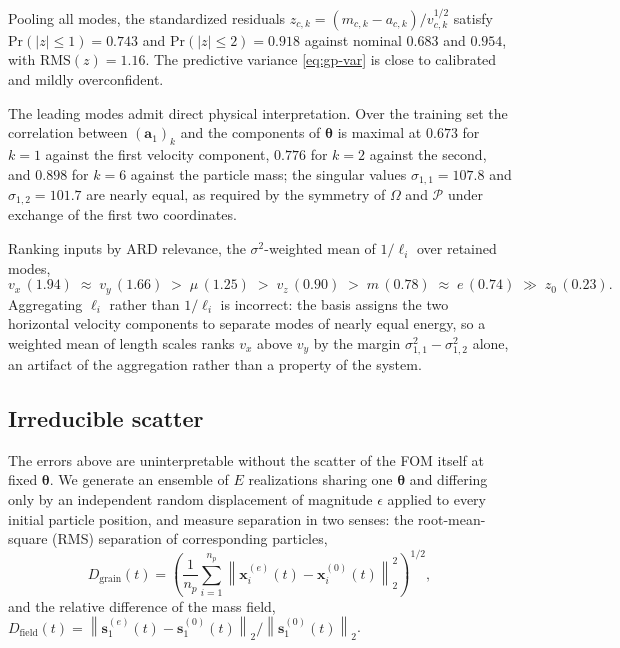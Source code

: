 \documentclass[11pt]{article}
\newcommand{\bs}[1]{\boldsymbol{#1}}
\newcommand{\norm}[1]{\left\lVert #1 \right\rVert}
\begin{document}
Pooling all modes, the standardized residuals
$z_{c,k} = (m_{c,k} - a_{c,k}) / v_{c,k}^{1/2}$ satisfy
$\mathrm{Pr}(|z| \leq 1) = 0.743$ and $\mathrm{Pr}(|z| \leq 2) = 0.918$ against nominal
$0.683$ and $0.954$, with $\mathrm{RMS}(z) = 1.16$. The predictive variance
\eqref{eq:gp-var} is close to calibrated and mildly overconfident.

The leading modes admit direct physical interpretation. Over the training set the
correlation between $(\bs{a}_1)_k$ and the components of $\bs{\theta}$ is maximal at $0.673$
for $k=1$ against the first velocity component, $0.776$ for $k=2$ against the second, and
$0.898$ for $k=6$ against the particle mass; the singular values $\sigma_{1,1} = 107.8$ and
$\sigma_{1,2} = 101.7$ are nearly equal, as required by the symmetry of $\Omega$ and
$\mathcal{P}$ under exchange of the first two coordinates.

Ranking inputs by ARD relevance, the $\sigma^2$-weighted mean of $1/\ell_i$ over retained
modes,
\begin{equation}
  v_{x}\,(1.94) \; \approx \; v_{y}\,(1.66) \; > \; \mu\,(1.25) \; > \;
  v_{z}\,(0.90) \; > \; m\,(0.78) \; \approx \; e\,(0.74) \; \gg \; z_0\,(0.23).
\end{equation}
Aggregating $\ell_i$ rather than $1/\ell_i$ is incorrect: the basis assigns the two
horizontal velocity components to separate modes of nearly equal energy, so a weighted mean
of length scales ranks $v_x$ above $v_y$ by the margin
$\sigma_{1,1}^2 - \sigma_{1,2}^2$ alone, an artifact of the aggregation rather than a
property of the system.

\subsection{Irreducible scatter}
\label{sec:floor}

The errors above are uninterpretable without the scatter of the FOM itself at fixed
$\bs{\theta}$. We generate an ensemble of $E$ realizations sharing one $\bs{\theta}$ and
differing only by an independent random displacement of magnitude $\epsilon$ applied to
every initial particle position, and measure separation in two senses: the root-mean-square
(RMS) separation of corresponding particles,
\begin{equation}
  D_{\text{grain}}(t) = \left( \frac{1}{n_p} \sum_{i=1}^{n_p}
  \norm{ \bs{x}_i^{(e)}(t) - \bs{x}_i^{(0)}(t) }_2^2 \right)^{1/2},
  \label{eq:grain-divergence}
\end{equation}
and the relative difference of the mass field,
$D_{\text{field}}(t) = \norm{\bs{s}_1^{(e)}(t) - \bs{s}_1^{(0)}(t)}_2 /
\norm{\bs{s}_1^{(0)}(t)}_2$.
\end{document}
